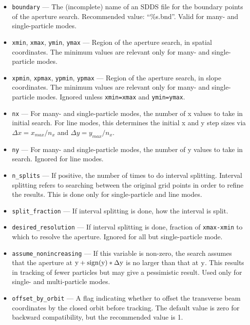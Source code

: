 \documentclass[11pt]{article}
\begin{document}
\begin{itemize}
\item \verb|boundary| --- The (incomplete) name of an SDDS 
file for the boundary points of the aperture search.  Recommended value: ``\%s.bnd''.
Valid for many- and single-particle modes.

\item \verb|xmin|, \verb|xmax|, \verb|ymin|, \verb|ymax| ---
  Region of the aperture search, in spatial coordinates. The minimum values are relevant only for many- and single-particle modes.

\item \verb|xpmin|, \verb|xpmax|, \verb|ypmin|, \verb|ypmax| ---
  Region of the aperture search, in slope coordinates. The minimum values are relevant only for many- and single-particle modes.
  Ignored unless \verb|xmin=xmax| and \verb|ymin=ymax|.

\item \verb|nx| --- For many- and single-particle modes, the number of x values to take in initial search.
  For line modes, this determines the initial x and y step sizes via $\Delta x = x_{max}/n_x$ and
  $\Delta y = y_{max}/n_x$.
\item \verb|ny| --- For many- and single-particle modes, the number of y values to take in search.
  Ignored for line modes.

\item \verb|n_splits| --- If positive, the number of times to do
interval splitting.  Interval splitting refers to searching between
the original grid points in order to refine the results.  This is done
only for single-particle and line modes.

\item \verb|split_fraction| --- If interval splitting is done, how the interval is split.

\item \verb|desired_resolution| --- If interval splitting is done,
fraction of \verb|xmax-xmin| to which to resolve the aperture.  Ignored for all but single-particle
mode.

\item \verb|assume_nonincreasing| --- If this variable is non-zero, the search assumes that the aperture
at ${\rm y+sign(y)*\Delta y}$ is no larger than that at ${\rm y}$.  This results in tracking of
fewer particles but may give a pessimistic result.    Used only for single- and multi-particle
modes.

\item \verb|offset_by_orbit| --- A flag indicating whether to offset
the transverse beam coordinates by the closed orbit before tracking.  The default value is
zero for backward compatibility, but the recommended value is 1.


\end{itemize}
\end{document}
